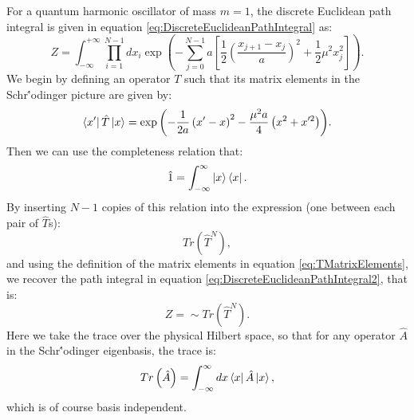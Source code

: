\documentclass[12pt]{article}
\begin{document}
        For a quantum harmonic oscillator of mass $m=1$, the discrete Euclidean path integral is given in equation \ref{eq:DiscreteEuclideanPathIntegral} as:
        \begin{equation}
            \label{eq:DiscreteEuclideanPathIntegral2}
            Z = \int^{+\infty}_{-\infty}\prod_{i=1}^{N-1}dx_i \exp{\left(-\sum^{N-1}_{j=0} a \left[\frac{1}{2}\left(\frac{x_{j+1}-x_j}{a}\right)^2+\frac{1}{2}\mu^2x_{j}^2\right]\right)}.
        \end{equation}
        We begin by defining an operator $T$ such that its matrix elements in the Schr{\''o}dinger picture are given by:
        \begin{equation}
            \label{eq:TMatrixElements}
            \bra{x'}\hat{T}\ket{x} = \exp{\left(-\frac{1}{2a}\left(x'-x\right)^2-\frac{\mu^2a}{4}\left(x^2+x'^2\right)\right)}.
        \end{equation}
        Then we can use the completeness relation that:
        \begin{equation}
            \label{eq:CompletenessRelation}
            \hat{1} = \int_{-\infty}^{\infty}\ket{x}\bra{x}.
        \end{equation}
        By inserting $N-1$ copies of this relation into the expression (one between each pair of $\hat{T}$s):
        \begin{equation}
            \label{eq:TraceT}
            Tr\left(\hat{T}^{N}\right),
        \end{equation}
        and using the definition of the matrix elements in equation \ref{eq:TMatrixElements}, we recover the path integral in equation \ref{eq:DiscreteEuclideanPathIntegral2}, that is:
        \begin{equation}
            \label{eq:PathIntegralAsTrace}
            Z = \sim Tr\left(\hat{T}^N\right).
        \end{equation}
        Here we take the trace over the physical Hilbert space, so that for any operator $\hat{A}$ in the Schr{\''o}dinger eigenbasis, the trace is:
        \begin{equation}
            \label{eq:Trace}
            Tr\left(\hat{A}\right) = \int_{-\infty}^{\infty}dx\bra{x}\hat{A}\ket{x},
        \end{equation}
        which is of course basis independent.
\end{document}
